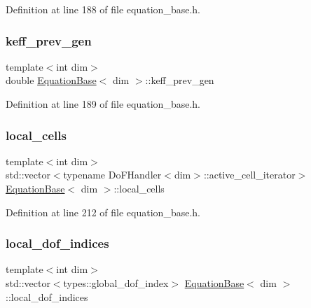 Definition at line 188 of file equation\+\_\+base.\+h.

\mbox{\label{class_equation_base_a80de7bca9496a5739f842ed154ecd274}} 
\subsubsection{\texorpdfstring{keff\+\_\+prev\+\_\+gen}{keff\_prev\_gen}}
{\footnotesize\ttfamily template$<$int dim$>$ \\
double \hyperlink{class_equation_base}{Equation\+Base}$<$ dim $>$\+::keff\+\_\+prev\+\_\+gen\hspace{0.3cm}{\ttfamily [protected]}}



Definition at line 189 of file equation\+\_\+base.\+h.

\mbox{\label{class_equation_base_a60d687f69ae6fd56881c15435e91e4e5}} 
\subsubsection{\texorpdfstring{local\+\_\+cells}{local\_cells}}
{\footnotesize\ttfamily template$<$int dim$>$ \\
std\+::vector$<$typename Do\+F\+Handler$<$dim$>$\+::active\+\_\+cell\+\_\+iterator$>$ \hyperlink{class_equation_base}{Equation\+Base}$<$ dim $>$\+::local\+\_\+cells\hspace{0.3cm}{\ttfamily [protected]}}



Definition at line 212 of file equation\+\_\+base.\+h.

\mbox{\label{class_equation_base_a63c4e27465bea3cf4c2348ea7f4782c8}} 
\subsubsection{\texorpdfstring{local\+\_\+dof\+\_\+indices}{local\_dof\_indices}}
{\footnotesize\ttfamily template$<$int dim$>$ \\
std\+::vector$<$types\+::global\+\_\+dof\+\_\+index$>$ \hyperlink{class_equation_base}{Equation\+Base}$<$ dim $>$\+::local\+\_\+dof\+\_\+indices\hspace{0.3cm}{\ttfamily [protected]}}



